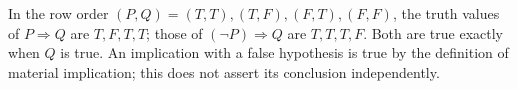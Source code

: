 In the row order $(P,Q)=(T,T),(T,F),(F,T),(F,F)$, the truth values of $P\Rightarrow Q$ are $T,F,T,T$; those of $(\neg P)\Rightarrow Q$ are $T,T,T,F$. Both are true exactly when $Q$ is true. An implication with a false hypothesis is true by the definition of material implication; this does not assert its conclusion independently.
